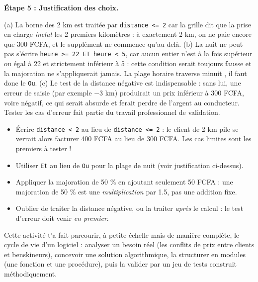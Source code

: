 \documentclass[11pt]{article}
\newcommand{\cle}[1]{{\popxbold\color{popdark}#1}}
\newcounter{popsec}
\newcounter{popsub}
\newcommand{\courssub}[1]{%
  \stepcounter{popsub}%
  \par\vspace{9pt}\noindent{\popxbold\fontsize{11.5}{13}\selectfont\color{popink}{\color{poporange}\thepopsec.\thepopsub}\hspace{6pt}#1}\par\nopagebreak\vspace{4pt}
}
\begin{document}
\begin{exoresolu}
\medskip
\textbf{Étape 5 : Justification des choix.}\par
(a) La borne des \num{2} km est traitée par \texttt{distance <= 2} car la grille dit que la prise en charge \emph{inclut} les 2 premiers kilomètres : à exactement \num{2} km, on ne paie encore que \num{300} FCFA, et le supplément ne commence qu'au-delà. (b) La nuit ne peut pas s'écrire \texttt{heure >= 22 ET heure < 5}, car aucun entier n'est à la fois supérieur ou égal à \num{22} et strictement inférieur à \num{5} : cette condition serait toujours fausse et la majoration ne s'appliquerait jamais. La plage horaire \og traverse minuit \fg, il faut donc le \texttt{Ou}. (c) Le test de la distance négative est indispensable : sans lui, une erreur de saisie (par exemple $-3$ km) produirait un prix inférieur à \num{300} FCFA, voire négatif, ce qui serait absurde et ferait perdre de l'argent au conducteur. Tester les cas d'erreur fait partie du travail professionnel de validation.
\end{exoresolu}

\begin{attention}
\begin{itemize}
\item Écrire \texttt{distance < 2} au lieu de \texttt{distance <= 2} : le client de \num{2} km pile se verrait alors facturer \num{400} FCFA au lieu de \num{300} FCFA. Les \cle{cas limites} sont les premiers à tester !
\item Utiliser \texttt{Et} au lieu de \texttt{Ou} pour la plage de nuit (voir justification ci-dessus).
\item Appliquer la majoration de \num{50} \% en ajoutant seulement \num{50} FCFA : une majoration de \num{50} \% est une \emph{multiplication} par \num{1,5}, pas une addition fixe.
\item Oublier de traiter la distance négative, ou la traiter \emph{après} le calcul : le test d'erreur doit venir \emph{en premier}.
\end{itemize}
\end{attention}

\courssub{Bilan de l'activité}

Cette activité t'a fait parcourir, à petite échelle mais de manière complète, le \cle{cycle de vie d'un logiciel} : analyser un besoin réel (les conflits de prix entre clients et benskineurs), concevoir une solution algorithmique, la structurer en modules (une fonction et une procédure), puis la valider par un jeu de tests construit méthodiquement.
\end{document}
